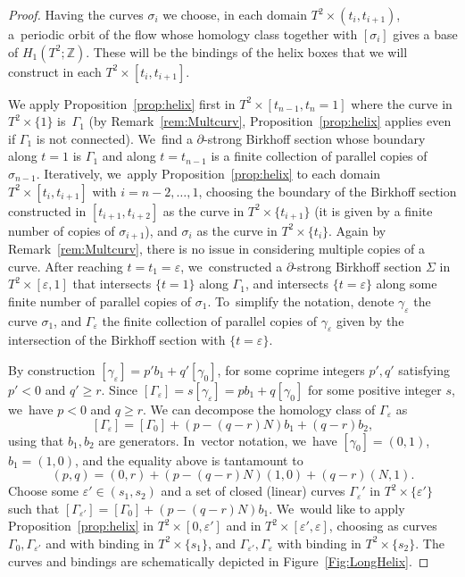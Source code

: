 \documentclass[JEP,XML,SOM,Unicode,NoEqCountersInSection,NoFloatCountersInSection,published]{cedram}
\theoremstyle{definition}
\begin{document}
\begin{proof}
Having the curves $\sigma_i$ we choose, in each domain $T^2\times (t_i, t_{i+1})$, a~periodic orbit of the flow whose homology class together with $[\sigma_i]$ gives a base of $H_1(T^2;\mathbb{Z})$. These will be the bindings of the helix boxes that we will construct in each $T^2\times [t_i, t_{i+1}]$.

We apply Proposition~\ref{prop:helix} first in $T^2\times [t_{n-1},t_n=1]$ where the curve in $T^2\times \{1\}$ is~$\Gamma_1$ (by Remark~\ref{rem:Multcurv}, Proposition~\ref{prop:helix} applies even if $\Gamma_1$ is not connected). We~find a $\partial$-strong Birkhoff section whose boundary along $t=1$ is $\Gamma_1$ and along $t=t_{n-1}$ is a finite collection of parallel copies of $\sigma_{n-1}$. Iteratively, we~apply Proposition~\ref{prop:helix} to each domain $T^2\times [t_i,t_{i+1}]$ with $i=n-2,\dots,1$, choosing the boundary of the Birkhoff section constructed in $[t_{i+1},t_{i+2}]$ as the curve in $T^2\times \{t_{i+1}\}$ (it is given by a finite number of copies of $\sigma_{i+1}$), and $\sigma_i$ as the curve in $T^2\times \{t_i\}$. Again by Remark~\ref{rem:Multcurv}, there is no issue in considering multiple copies of a curve. After reaching $t=t_1=\varepsilon$, we~constructed a $\partial$-strong Birkhoff section $\Sigma$ in $T^2\times [\varepsilon,1]$ that intersects $\{t=1\}$ along $\Gamma_1$, and intersects $\{t=\varepsilon\}$ along some finite number of parallel copies of $\sigma_1$. To~simplify the notation, denote $\gamma_\varepsilon$ the curve $\sigma_1$, and $\Gamma_\varepsilon$ the finite collection of parallel copies of $\gamma_\varepsilon$ given by the intersection of the Birkhoff section with $\{t=\varepsilon\}$.

By construction $[\gamma_\varepsilon]= p' b_1 + q' [\gamma_0]$,
for some coprime integers $p',q'$ satisfying $p'<0$ and $q'\geq r$. Since
$[\Gamma_\varepsilon]= s[\gamma_\varepsilon]=pb_1+q[\gamma_0]$
for some positive integer $s$, we~have $p<0$ and $q\geq r$.
We can decompose the homology class of $\Gamma_\varepsilon$ as
\[
[\Gamma_\varepsilon]= [\Gamma_0] + (p-(q-r)N)b_1 + (q-r)b_2,
\]
using that $b_1,b_2$ are generators. In~vector notation, we~have $[\gamma_0]=(0,1)$, $b_1=(1,0)$, and the equality above is tantamount to
\[
(p,q)= (0,r) + (p-(q-r)N)(1,0) + (q-r) (N,1).
\]
Choose some $\varepsilon'\in (s_1,s_2)$ and a set of closed (linear) curves $\Gamma_\varepsilon'$ in $T^2\times \{\varepsilon'\}$ such that $[\Gamma_{\varepsilon'}]=[\Gamma_0]+(p-(q-r)N)b_1$. We~would like to apply Proposition~\ref{prop:helix} in $T^2\times [0,\varepsilon']$ and in $T^2\times [\varepsilon',\varepsilon]$, choosing as curves $\Gamma_0, \Gamma_{\varepsilon'}$ and with binding in $T^2\times \{s_1\}$, and $\Gamma_{\varepsilon'}, \Gamma_{\varepsilon}$ with binding in $T^2\times \{s_2\}$. The curves and bindings are schematically depicted in Figure~\ref{Fig:LongHelix}.


\end{proof}
\end{document}

